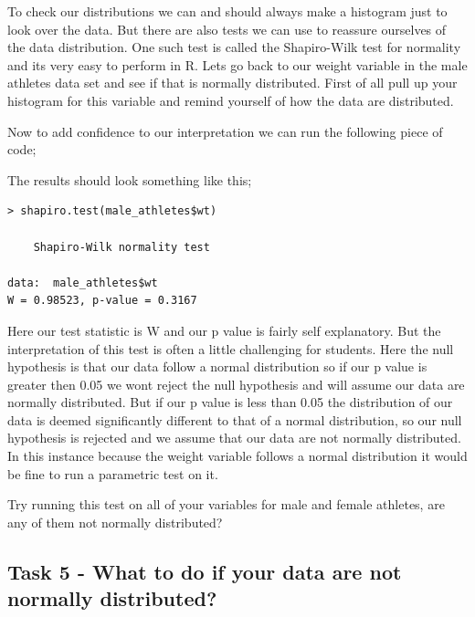 \documentclass[
]{book}
\newenvironment{Shaded}{\begin{snugshade}}{\end{snugshade}}
\newcommand{\CommentTok}[1]{\textcolor[rgb]{0.56,0.35,0.01}{\textit{#1}}}
\newcommand{\FunctionTok}[1]{\textcolor[rgb]{0.13,0.29,0.53}{\textbf{#1}}}
\newcommand{\NormalTok}[1]{#1}
\newcommand{\SpecialCharTok}[1]{\textcolor[rgb]{0.81,0.36,0.00}{\textbf{#1}}}
\begin{document}
To check our distributions we can and should always make a histogram just to look over the data. But there are also tests we can use to reassure ourselves of the data distribution. One such test is called the Shapiro-Wilk test for normality and its very easy to perform in R. Lets go back to our weight variable in the male athletes data set and see if that is normally distributed. First of all pull up your histogram for this variable and remind yourself of how the data are distributed.

Now to add confidence to our interpretation we can run the following piece of code;

\begin{Shaded}
\end{Shaded}

The results should look something like this;

\begin{verbatim}
> shapiro.test(male_athletes$wt)

    Shapiro-Wilk normality test

data:  male_athletes$wt
W = 0.98523, p-value = 0.3167
\end{verbatim}

Here our test statistic is W and our p value is fairly self explanatory. But the interpretation of this test is often a little challenging for students. Here the null hypothesis is that our data follow a normal distribution so if our p value is greater then 0.05 we wont reject the null hypothesis and will assume our data are normally distributed. But if our p value is less than 0.05 the distribution of our data is deemed significantly different to that of a normal distribution, so our null hypothesis is rejected and we assume that our data are not normally distributed. In this instance because the weight variable follows a normal distribution it would be fine to run a parametric test on it.

Try running this test on all of your variables for male and female athletes, are any of them not normally distributed?

\hypertarget{task-5---what-to-do-if-your-data-are-not-normally-distributed}{%
\subsection{Task 5 - What to do if your data are not normally distributed?}\label{task-5---what-to-do-if-your-data-are-not-normally-distributed}}
\end{document}
